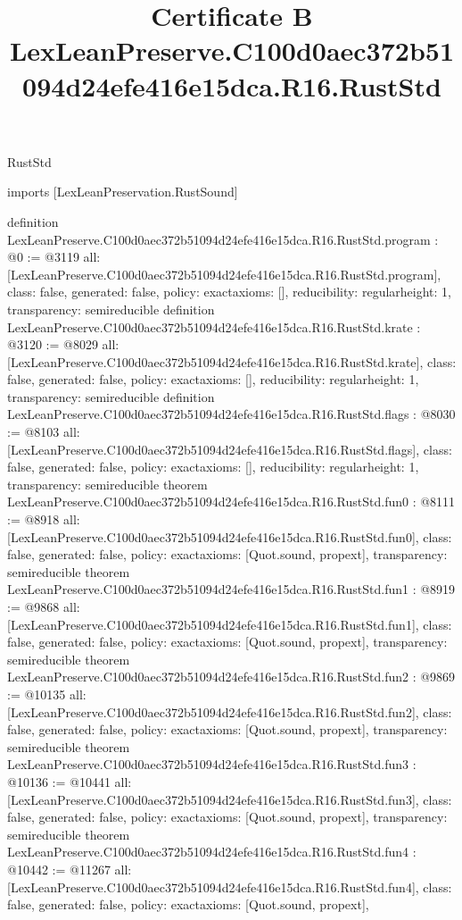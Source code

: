 \begin{lexlean}{RustStd}
\title{Certificate B LexLeanPreserve.C100d0aec372b51094d24efe416e15dca.R16.RustStd}
\begin{coremodule}
imports [LexLeanPreservation.RustSound]

definition LexLeanPreserve.C100d0aec372b51094d24efe416e15dca.R16.RustStd.program : @0 := @3119 {
  all: [LexLeanPreserve.C100d0aec372b51094d24efe416e15dca.R16.RustStd.program],
  class: false,
  generated: false,
  policy: exact{axioms: []},
  reducibility: regular{height: 1},
  transparency: semireducible
}
definition LexLeanPreserve.C100d0aec372b51094d24efe416e15dca.R16.RustStd.krate : @3120 := @8029 {
  all: [LexLeanPreserve.C100d0aec372b51094d24efe416e15dca.R16.RustStd.krate],
  class: false,
  generated: false,
  policy: exact{axioms: []},
  reducibility: regular{height: 1},
  transparency: semireducible
}
definition LexLeanPreserve.C100d0aec372b51094d24efe416e15dca.R16.RustStd.flags : @8030 := @8103 {
  all: [LexLeanPreserve.C100d0aec372b51094d24efe416e15dca.R16.RustStd.flags],
  class: false,
  generated: false,
  policy: exact{axioms: []},
  reducibility: regular{height: 1},
  transparency: semireducible
}
theorem LexLeanPreserve.C100d0aec372b51094d24efe416e15dca.R16.RustStd.fun0 : @8111 := @8918 {
  all: [LexLeanPreserve.C100d0aec372b51094d24efe416e15dca.R16.RustStd.fun0],
  class: false,
  generated: false,
  policy: exact{axioms: [Quot.sound, propext]},
  transparency: semireducible
}
theorem LexLeanPreserve.C100d0aec372b51094d24efe416e15dca.R16.RustStd.fun1 : @8919 := @9868 {
  all: [LexLeanPreserve.C100d0aec372b51094d24efe416e15dca.R16.RustStd.fun1],
  class: false,
  generated: false,
  policy: exact{axioms: [Quot.sound, propext]},
  transparency: semireducible
}
theorem LexLeanPreserve.C100d0aec372b51094d24efe416e15dca.R16.RustStd.fun2 : @9869 := @10135 {
  all: [LexLeanPreserve.C100d0aec372b51094d24efe416e15dca.R16.RustStd.fun2],
  class: false,
  generated: false,
  policy: exact{axioms: [Quot.sound, propext]},
  transparency: semireducible
}
theorem LexLeanPreserve.C100d0aec372b51094d24efe416e15dca.R16.RustStd.fun3 : @10136 := @10441 {
  all: [LexLeanPreserve.C100d0aec372b51094d24efe416e15dca.R16.RustStd.fun3],
  class: false,
  generated: false,
  policy: exact{axioms: [Quot.sound, propext]},
  transparency: semireducible
}
theorem LexLeanPreserve.C100d0aec372b51094d24efe416e15dca.R16.RustStd.fun4 : @10442 := @11267 {
  all: [LexLeanPreserve.C100d0aec372b51094d24efe416e15dca.R16.RustStd.fun4],
  class: false,
  generated: false,
  policy: exact{axioms: [Quot.sound, propext]},
}
\end{coremodule}
\end{lexlean}

